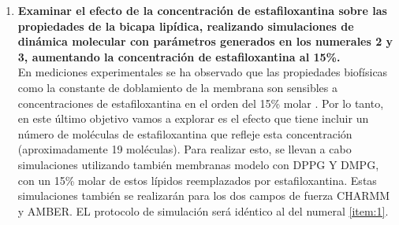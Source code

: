 \begin{enumerate}
\item \textbf{ Examinar el efecto de la concentraci\'{o}n de estafiloxantina sobre las propiedades de la bicapa lip\'{i}dica, realizando simulaciones de din\'{a}mica molecular con par\'{a}metros generados en los numerales 2 y 3, aumentando  la concentraci\'{o}n de estafiloxantina al 15\%.}\label{item:4}\\

En mediciones experimentales se ha observado que las propiedades biof\'{i}sicas como la constante de doblamiento de la membrana son sensibles a concentraciones de estafiloxantina en el orden del 15\% molar \cite{Perez-LopezVariationsProperties}. Por lo tanto, en este \'{u}ltimo objetivo vamos a explorar es el efecto que tiene incluir un n\'{u}mero de mol\'{e}culas de estafiloxantina que refleje esta concentraci\'{o}n (aproximadamente 19 mol\'{e}culas). Para realizar esto, se llevan a cabo simulaciones utilizando tambi\'{e}n membranas modelo con DPPG Y DMPG, con un 15\% molar de estos l\'{i}pidos reemplazados por estafiloxantina. Estas simulaciones tambi\'{e}n se realizar\'{a}n para los dos campos de fuerza CHARMM y AMBER. EL protocolo de simulaci\'{o}n ser\'{a} id\'{e}ntico al del numeral \ref{item:1}.

\end{enumerate}
